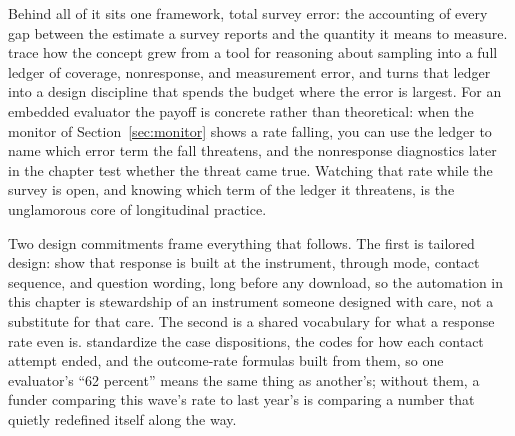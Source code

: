 \documentclass[
    a4paper,
    fontsize=10pt,
    twoside=true,
    numbers=noenddot,
]{kaobook}
\begin{document}
Behind all of it sits one framework, total survey error: the accounting of every gap between the estimate a survey reports and the quantity it means to measure. \textcite{groves2010tse} trace how the concept grew from a tool for reasoning about sampling into a full ledger of coverage, nonresponse, and measurement error, and \textcite{biemer2010tse} turns that ledger into a design discipline that spends the budget where the error is largest. For an embedded evaluator the payoff is concrete rather than theoretical: when the monitor of Section~\ref{sec:monitor} shows a rate falling, you can use the ledger to name which error term the fall threatens, and the nonresponse diagnostics later in the chapter test whether the threat came true. Watching that rate while the survey is open, and knowing which term of the ledger it threatens, is the unglamorous core of longitudinal practice.

Two design commitments frame everything that follows. The first is tailored design: \textcite{dillman2014tailored} show that response is built at the instrument, through mode, contact sequence, and question wording, long before any download, so the automation in this chapter is stewardship of an instrument someone designed with care, not a substitute for that care. The second is a shared vocabulary for what a response rate even is. \textcite{aapor2023standard} standardize the case dispositions, the codes for how each contact attempt ended, and the outcome-rate formulas built from them, so one evaluator's ``62 percent'' means the same thing as another's; without them, a funder comparing this wave's rate to last year's is comparing a number that quietly redefined itself along the way.
\end{document}
